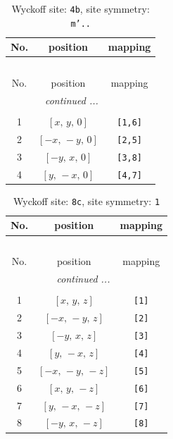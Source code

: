 \documentclass[fleqn,8pt]{jsarticle}
\begin{document}
\begin{longtable}{ccc}
\caption{Wyckoff site: {\tt 4b}, site symmetry: {\tt m'..}}
 \\
 \hline \hline
No. & position & mapping \\ \hline \endfirsthead

\multicolumn{2}{l}{\tablename\ \thetable{}} \\
 \hline \hline
No. & position & mapping \\ \hline \endhead

 \hline \hline
\multicolumn{2}{r}{\footnotesize\it continued ...} \\ \endfoot

 \hline \hline
\multicolumn{2}{r}{} \\ \endlastfoot

1 & $\left[ x,\, y,\, 0 \right]$ & {\tt [1,6]} \\ \hline
2 & $\left[ - x,\, - y,\, 0 \right]$ & {\tt [2,5]} \\ \hline
3 & $\left[ - y,\, x,\, 0 \right]$ & {\tt [3,8]} \\ \hline
4 & $\left[ y,\, - x,\, 0 \right]$ & {\tt [4,7]} \\
\end{longtable}
\renewcommand{\arraystretch}{1.2}
\begin{longtable}{ccc}
\caption{Wyckoff site: {\tt 8c}, site symmetry: {\tt 1}}
 \\
 \hline \hline
No. & position & mapping \\ \hline \endfirsthead

\multicolumn{2}{l}{\tablename\ \thetable{}} \\
 \hline \hline
No. & position & mapping \\ \hline \endhead

 \hline \hline
\multicolumn{2}{r}{\footnotesize\it continued ...} \\ \endfoot

 \hline \hline
\multicolumn{2}{r}{} \\ \endlastfoot

1 & $\left[ x,\, y,\, z \right]$ & {\tt [1]} \\ \hline
2 & $\left[ - x,\, - y,\, z \right]$ & {\tt [2]} \\ \hline
3 & $\left[ - y,\, x,\, z \right]$ & {\tt [3]} \\ \hline
4 & $\left[ y,\, - x,\, z \right]$ & {\tt [4]} \\ \hline
5 & $\left[ - x,\, - y,\, - z \right]$ & {\tt [5]} \\ \hline
6 & $\left[ x,\, y,\, - z \right]$ & {\tt [6]} \\ \hline
7 & $\left[ y,\, - x,\, - z \right]$ & {\tt [7]} \\ \hline
8 & $\left[ - y,\, x,\, - z \right]$ & {\tt [8]} \\
\end{longtable}
\end{document}
